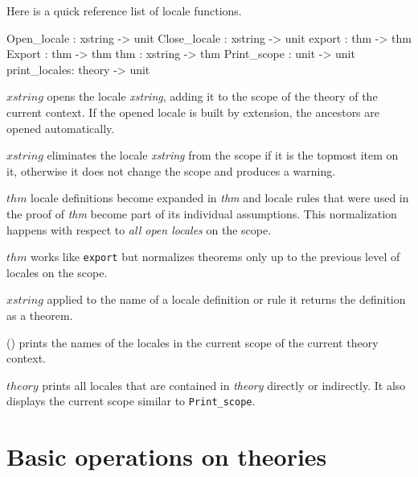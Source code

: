Here is a quick reference list of locale functions.
\begin{ttbox}
  Open_locale  : xstring -> unit 
  Close_locale : xstring -> unit
  export       :     thm -> thm
  Export       :     thm -> thm
  thm          : xstring -> thm
  Print_scope  :    unit -> unit
  print_locales:  theory -> unit
\end{ttbox}
\begin{ttdescription}
\item[\ttindexbold{Open_locale} $xstring$] 
    opens the locale {\it xstring}, adding it to the scope of the theory of the
  current context.  If the opened locale is built by extension, the ancestors
  are opened automatically.
  
\item[\ttindexbold{Close_locale} $xstring$] eliminates the locale {\it
    xstring} from the scope if it is the topmost item on it, otherwise it does
  not change the scope and produces a warning.

\item[\ttindexbold{export} $thm$] locale definitions become expanded in {\it
    thm} and locale rules that were used in the proof of {\it thm} become part
  of its individual assumptions.  This normalization happens with respect to
  \emph{all open locales} on the scope.
  
\item[\ttindexbold{Export} $thm$] works like \texttt{export} but normalizes
  theorems only up to the previous level of locales on the scope.
  
\item[\ttindexbold{thm} $xstring$] applied to the name of a locale definition
  or rule it returns the definition as a theorem.
  
\item[\ttindexbold{Print_scope}()] prints the names of the locales in the
  current scope of the current theory context.
  
\item[\ttindexbold{print_locale} $theory$] prints all locales that are
  contained in {\it theory} directly or indirectly.  It also displays the
  current scope similar to \texttt{Print\_scope}.
\end{ttdescription}


\section{Basic operations on theories}\label{BasicOperationsOnTheories}

